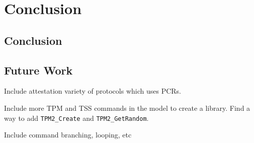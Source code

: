 \chapter{Conclusion}



\section{Conclusion}

\section{Future Work}
Include attestation variety of protocols which uses PCRs.

Include more TPM and TSS commands in the model to create a library. Find a way to add \verb|TPM2_Create| and \verb|TPM2_GetRandom|.

Include command branching, looping, etc

